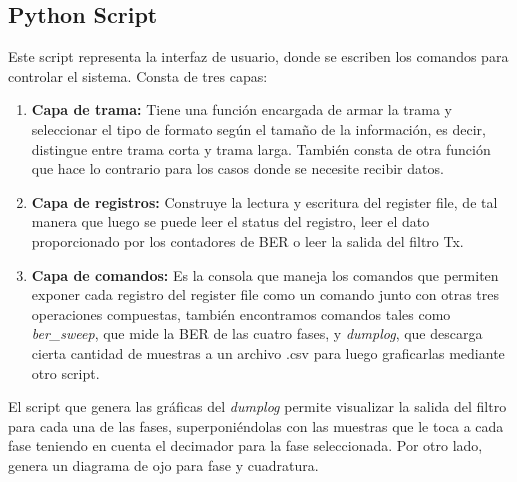 \documentclass[12pt, a4paper]{article}
\begin{document}
    \subsection{Python Script}
        Este script representa la interfaz de usuario, donde se escriben los comandos para controlar el sistema. Consta de tres capas:
        \begin{enumerate}
            \item \textbf{Capa de trama:} Tiene una función encargada de armar la trama y seleccionar el tipo de formato según el tamaño de la información, es decir, distingue entre trama corta
            y trama larga. También consta de otra función que hace lo contrario para los casos donde se necesite recibir datos.
            \item \textbf{Capa de registros:} Construye la lectura y escritura del register file, de tal manera que luego se puede leer el status del registro, leer el dato proporcionado
            por los contadores de BER o leer la salida del filtro Tx.
            \item \textbf{Capa de comandos:} Es la consola que maneja los comandos que permiten exponer cada registro del register file como un comando junto con otras tres operaciones compuestas,
            también encontramos comandos tales como \textit{ber\_sweep}, que mide la BER de las cuatro fases, y \textit{dumplog}, que descarga cierta cantidad de muestras a un archivo .csv para luego
            graficarlas mediante otro script.
        \end{enumerate}
        El script que genera las gráficas del \textit{dumplog} permite visualizar la salida del filtro para cada una de las fases, superponiéndolas
        con las muestras que le toca a cada fase teniendo en cuenta el decimador para la fase seleccionada. Por otro lado, genera un diagrama de ojo para fase y cuadratura.
        
\end{document}

